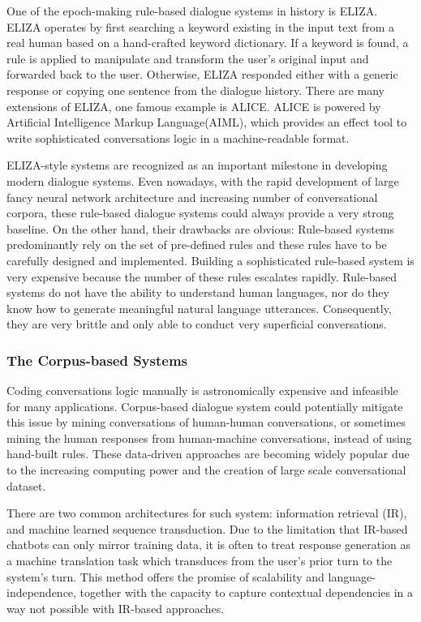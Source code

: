 \documentclass[bsc,frontabs,twoside,singlespacing,parskip,deptreport]{infthesis}     %
\begin{document}
One of the epoch-making rule-based dialogue systems in history is ELIZA\cite{weizenbaum1966eliza}. ELIZA operates by first searching a keyword existing in the input text from a real human based on a hand-crafted keyword dictionary. If a keyword is found, a rule is applied to manipulate and transform the user’s original input and forwarded back to the user. Otherwise, ELIZA responded either with a generic response or copying one sentence from the dialogue history. There are many extensions of ELIZA, one famous example is ALICE\cite{wallace1995artificial}. ALICE is powered by Artificial Intelligence Markup Language(AIML), which provides an effect tool to write sophisticated conversations logic in a machine-readable format.

ELIZA-style systems are recognized as an important milestone in developing modern dialogue systems. Even nowadays, with the rapid development of large fancy neural network architecture and increasing number of conversational corpora, these rule-based dialogue systems could always provide a very strong baseline. On the other hand, their drawbacks are obvious: Rule-based systems predominantly rely on the set of pre-defined rules and these rules have to be carefully designed and implemented. Building a sophisticated rule-based system is very expensive because the number of these rules escalates rapidly. Rule-based systems do not have the ability to understand human languages, nor do they know how to generate meaningful natural language utterances\cite{jiweilithesis}. Consequently, they are very brittle and only able to conduct very superficial conversations.

\subsubsection*{The Corpus-based Systems}

Coding conversations logic manually is astronomically expensive and infeasible for many applications. Corpus-based dialogue system could potentially mitigate this issue by mining conversations of human-human conversations, or sometimes mining the human responses from human-machine conversations, instead of using hand-built rules. These data-driven approaches are becoming widely popular due to the increasing computing power and the creation of large scale conversational dataset. 

There are two common architectures for such system:  information retrieval (IR), and machine learned sequence transduction. Due to the limitation that IR-based chatbots can only mirror training data, it is often to treat response generation as a machine translation task which transduces from the user’s prior turn to the system’s turn. This method offers the promise of scalability and language-independence, together with the capacity to capture contextual dependencies in a way not possible with IR-based approaches.
\end{document}
